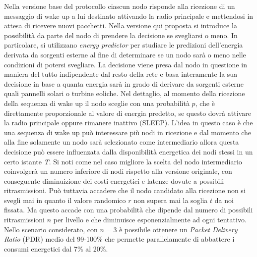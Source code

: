 \documentclass{report}
\begin{document}
Nella versione base del protocollo ciascun nodo risponde alla ricezione di un messaggio di wake up a lui destinato attivando la radio principale e mettendosi
in attesa di ricevere nuovi pacchetti. Nella versione qui proposta si introduce la possibilità da parte del nodo di prendere la decisione se svegliarsi o meno.
In particolare, si utilizzano \emph{energy predictor} per studiare le predizioni dell'energia derivata da sorgenti esterne al fine di determinare se un nodo sarà o
meno nelle condizioni di potersi svegliare. La decisione viene presa dal nodo in questione in maniera del tutto indipendente dal resto della rete e basa interamente
la sua decisione in base a quanta energia sarà in grado di derivare da sorgenti esterne quali pannelli solari o turbine eoliche. Nel dettaglio, al momento
della ricezione della sequenza di wake up il nodo sceglie con una probabilità $p$, che è direttamente proporzionale al valore di energia predetto,
se questo dovrà attivare la radio principale oppure rimanere inattivo (SLEEP). L'idea in questo caso è che una sequenza di wake up può interessare più nodi
in ricezione e dal momento che alla fine solamente un nodo sarà selezionato come intermediario allora questa decisione può essere influenzata dalla
disponibilità energetica dei nodi stessi in un certo istante \emph{T}. Si noti come nel caso migliore la scelta del nodo intermediario coinvolgerà un numero
inferiore di nodi rispetto alla versione originale, con conseguente diminuizione dei costi energetici e latenze dovute a possibili ritrasmissioni.
Può tuttavia accadere che il nodo candidato alla ricezione non si svegli mai in quanto il valore randomico $r$ non supera mai la soglia $t$ da noi fissata.
Ma questo accade con una probabilità che dipende dal numero di possibili ritrasmissioni $n$ per livello e che diminuisce esponenzialmente ad ogni tentativo.
Nello scenario considerato, con $n=3$ è possibile ottenere un \emph{Packet Delivery Ratio} (PDR) medio del 99-100\% che permette parallelamente di abbattere i
consumi energetici dal 7\% al 20\%.\\
\end{document}
